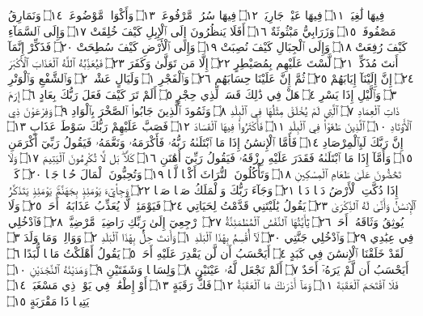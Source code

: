 فِيهَا لَٰغِيَةࣰ ۝١١ فِيهَا عَيْنࣱ جَارِيَةࣱ ۝١٢ فِيهَا سُرُرࣱ مَّرْفُوعَةࣱ ۝١٣ وَأَكْوَابࣱ
مَّوْضُوعَةࣱ ۝١٤ وَنَمَارِقُ مَصْفُوفَةࣱ ۝١٥ وَزَرَابِيُّ مَبْثُوثَةٌ ۝١٦ أَفَلَا يَنظُرُونَ
إِلَى ٱلْإِبِلِ كَيْفَ خُلِقَتْ ۝١٧ وَإِلَى ٱلسَّمَآءِ كَيْفَ رُفِعَتْ ۝١٨ وَإِلَى
ٱلْجِبَالِ كَيْفَ نُصِبَتْ ۝١٩ وَإِلَى ٱلْأَرْضِ كَيْفَ سُطِحَتْ ۝٢٠
فَذَكِّرْ إِنَّمَآ أَنتَ مُذَكِّرࣱ ۝٢١ لَّسْتَ عَلَيْهِم بِمُصَيْطِرٍ ۝٢٢
إِلَّا مَن تَوَلَّىٰ وَكَفَرَ ۝٢٣ فَيُعَذِّبُهُ ٱللَّهُ ٱلْعَذَابَ ٱلْأَكْبَرَ ۝٢٤
إِنَّ إِلَيْنَآ إِيَابَهُمْ ۝٢٥ ثُمَّ إِنَّ عَلَيْنَا حِسَابَهُم ۝٢٦
وَٱلْفَجْرِ ۝١ وَلَيَالٍ عَشْرࣲ ۝٢ وَٱلشَّفْعِ وَٱلْوَتْرِ ۝٣ وَٱلَّيْلِ إِذَا يَسْرِ ۝٤
هَلْ فِي ذَٰلِكَ قَسَمࣱ لِّذِي حِجْرٍ ۝٥ أَلَمْ تَرَ كَيْفَ فَعَلَ رَبُّكَ بِعَادٍ ۝٦
إِرَمَ ذَاتِ ٱلْعِمَادِ ۝٧ ٱلَّتِي لَمْ يُخْلَقْ مِثْلُهَا فِي ٱلْبِلَٰدِ ۝٨ وَثَمُودَ ٱلَّذِينَ
جَابُوا۟ ٱلصَّخْرَ بِٱلْوَادِ ۝٩ وَفِرْعَوْنَ ذِي ٱلْأَوْتَادِ ۝١٠ ٱلَّذِينَ طَغَوْا۟ فِي
ٱلْبِلَٰدِ ۝١١ فَأَكْثَرُوا۟ فِيهَا ٱلْفَسَادَ ۝١٢ فَصَبَّ عَلَيْهِمْ رَبُّكَ سَوْطَ
عَذَابٍ ۝١٣ إِنَّ رَبَّكَ لَبِٱلْمِرْصَادِ ۝١٤ فَأَمَّا ٱلْإِنسَٰنُ إِذَا مَا ٱبْتَلَىٰهُ
رَبُّهُۥ فَأَكْرَمَهُۥ وَنَعَّمَهُۥ فَيَقُولُ رَبِّيٓ أَكْرَمَنِ ۝١٥ وَأَمَّآ إِذَا مَا ٱبْتَلَىٰهُ
فَقَدَرَ عَلَيْهِ رِزْقَهُۥ فَيَقُولُ رَبِّيٓ أَهَٰنَنِ ۝١٦ كَلَّاۖ بَل لَّا تُكْرِمُونَ
ٱلْيَتِيمَ ۝١٧ وَلَا تَحَٰٓضُّونَ عَلَىٰ طَعَامِ ٱلْمِسْكِينِ ۝١٨ وَتَأْكُلُونَ
ٱلتُّرَاثَ أَكْلࣰا لَّمࣰّا ۝١٩ وَتُحِبُّونَ ٱلْمَالَ حُبࣰّا جَمࣰّا ۝٢٠ كَلَّآۖ إِذَا
دُكَّتِ ٱلْأَرْضُ دَكࣰّا دَكࣰّا ۝٢١ وَجَآءَ رَبُّكَ وَٱلْمَلَكُ صَفࣰّا صَفࣰّا ۝٢٢
وَجِا۟يٓءَ يَوْمَئِذِۭ بِجَهَنَّمَۚ يَوْمَئِذࣲ يَتَذَكَّرُ ٱلْإِنسَٰنُ وَأَنَّىٰ
لَهُ ٱلذِّكْرَىٰ ۝٢٣ يَقُولُ يَٰلَيْتَنِي قَدَّمْتُ لِحَيَاتِي ۝٢٤ فَيَوْمَئِذࣲ
لَّا يُعَذِّبُ عَذَابَهُۥٓ أَحَدࣱ ۝٢٥ وَلَا يُوثِقُ وَثَاقَهُۥٓ أَحَدࣱ ۝٢٦ يَٰٓأَيَّتُهَا
ٱلنَّفْسُ ٱلْمُطْمَئِنَّةُ ۝٢٧ ٱرْجِعِيٓ إِلَىٰ رَبِّكِ رَاضِيَةࣰ مَّرْضِيَّةࣰ ۝٢٨
فَٱدْخُلِي فِي عِبَٰدِي ۝٢٩ وَٱدْخُلِي جَنَّتِي ۝٣٠
لَآ أُقْسِمُ بِهَٰذَا ٱلْبَلَدِ ۝١ وَأَنتَ حِلُّۢ بِهَٰذَا ٱلْبَلَدِ ۝٢ وَوَالِدࣲ وَمَا وَلَدَ ۝٣
لَقَدْ خَلَقْنَا ٱلْإِنسَٰنَ فِي كَبَدٍ ۝٤ أَيَحْسَبُ أَن لَّن يَقْدِرَ عَلَيْهِ
أَحَدࣱ ۝٥ يَقُولُ أَهْلَكْتُ مَالࣰا لُّبَدًا ۝٦ أَيَحْسَبُ أَن لَّمْ يَرَهُۥٓ أَحَدٌ ۝٧
أَلَمْ نَجْعَل لَّهُۥ عَيْنَيْنِ ۝٨ وَلِسَانࣰا وَشَفَتَيْنِ ۝٩ وَهَدَيْنَٰهُ
ٱلنَّجْدَيْنِ ۝١٠ فَلَا ٱقْتَحَمَ ٱلْعَقَبَةَ ۝١١ وَمَآ أَدْرَىٰكَ مَا ٱلْعَقَبَةُ ۝١٢
فَكُّ رَقَبَةٍ ۝١٣ أَوْ إِطْعَٰمࣱ فِي يَوْمࣲ ذِي مَسْغَبَةࣲ ۝١٤ يَتِيمࣰا ذَا مَقْرَبَةٍ ۝١٥
